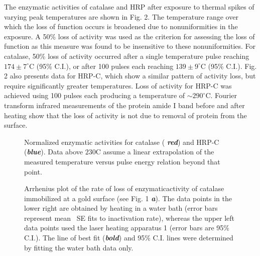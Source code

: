 \documentclass{biophys_letter}
\begin{document}
The enzymatic activities of catalase and HRP after exposure to thermal spikes of varying peak temperatures are shown in Fig. 2. The temperature range over which the loss of function occurs is broadened due to nonuniformities in the exposure. A 50\% loss of activity was used as the criterion for assessing the loss of function as this measure was found to be insensitive to these nonuniformities. For catalase, 50\% loss of activity occurred after a single temperature pulse reaching $174\pm 7^\circ$C (95\% C.I.), or after 100 pulses each reaching $139\pm 9^\circ$C (95\% C.I.). Fig. 2 also presents data for HRP-C, which show a similar pattern of activity loss, but require significantly greater temperatures. Loss of activity for HRP-C was achieved using 100 pulses each producing a temperature of ${\sim}290^\circ$C. Fourier transform infrared  measurements of the protein amide I band before and after heating show that the loss of activity is not due to removal of protein from the surface.
\begin{figure}[b!]\vspace*{-5pt}
\vspace*{-3pt}
\caption{Normalized enzymatic activities for catalase ({\bfseries\itshape
red}) and HRP-C ({\bfseries\itshape blue}). Data above $\mbox{230}$\textdegree C assume a linear extrapolation of the measured temperature versus pulse energy relation beyond that point.}
\vspace*{-1.5pt}
\end{figure}
\begin{figure}[t!]\vspace*{3pt}
\vspace*{-5.5pt}
\caption{Arrhenius plot of the rate of loss of enzymatic\break activity of catalase immobilized at a gold surface (see Fig. 1 {\bfseries\itshape a}). The data points in the lower right are obtained by heating in a water bath (error bars represent mean \textpm\ SE fits to inactivation rate), whereas the upper left data points used the laser heating apparatus 1 (error bars are 95\% C.I.). The line of best fit ({\bfseries\itshape bold}) and 95\% C.I. lines were determined by fitting the water bath data only.
}\vspace*{-8pt}
\end{figure}
\end{document}
